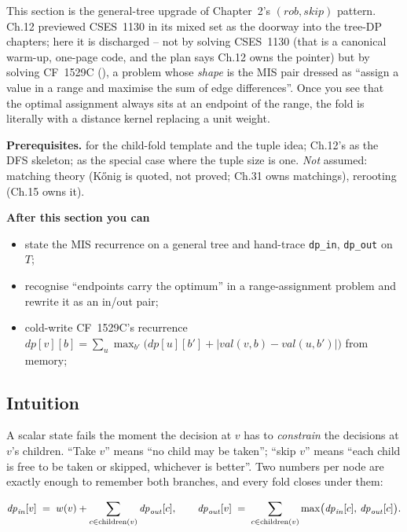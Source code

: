\begin{topicintro}
This section is the general-tree upgrade of Chapter~2's $(\mathit{rob},
\mathit{skip})$ pattern. Ch.12 previewed CSES~1130 in its mixed set as the
doorway into the tree-DP chapters; here it is discharged -- not by solving
CSES~1130 (that is a canonical warm-up, one-page code, and the plan says
Ch.12 owns the pointer) but by solving CF~1529C (),
a problem whose \emph{shape} is the MIS pair dressed as ``assign a value in
a range and maximise the sum of edge differences''. Once you see that the
optimal assignment always sits at an endpoint of the range, the fold is
literally  with a distance kernel replacing a
unit weight.

\textbf{Prerequisites.}  for the child-fold template
and the tuple idea; Ch.12's  as the DFS skeleton;
 as the special case where the tuple size is
one. \emph{Not} assumed: matching theory (K{\H{o}}nig is quoted, not proved;
Ch.31 owns matchings), rerooting (Ch.15 owns it).

\textbf{After this section you can}
\begin{itemize}[nosep]
  \item state the MIS recurrence on a general tree and hand-trace
        \lstinline{dp_in}, \lstinline{dp_out} on $T$; \hfill{}
  \item recognise ``endpoints carry the optimum'' in a range-assignment
        problem and rewrite it as an in/out pair; \hfill{}
  \item cold-write CF~1529C's recurrence
        $\mathit{dp}[v][b]=\sum_{u}\max_{b'}\big(\mathit{dp}[u][b']+|\mathit{val}(v,b)-\mathit{val}(u,b')|\big)$
        from memory; \hfill{}
\end{itemize}
\end{topicintro}

\subsection{Intuition}

A scalar state fails the moment the decision at $v$ has to \emph{constrain}
the decisions at $v$'s children. ``Take $v$'' means ``no child may be
taken''; ``skip $v$'' means ``each child is free to be taken or skipped,
whichever is better''. Two numbers per node are exactly enough to remember
both branches, and every fold closes under them:

\[
  \mathit{dp}_{\mathit{in}}[v] \;=\; w(v) + \sum_{c\in\operatorname{children}(v)}\mathit{dp}_{\mathit{out}}[c],
  \qquad
  \mathit{dp}_{\mathit{out}}[v] \;=\; \sum_{c\in\operatorname{children}(v)}\max\!\big(\mathit{dp}_{\mathit{in}}[c],\,\mathit{dp}_{\mathit{out}}[c]\big).
\]

